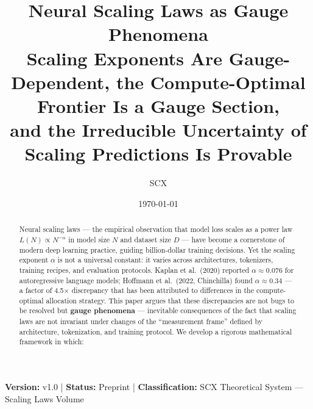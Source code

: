 \documentclass[12pt,a4paper]{article}
\title{\textbf{Neural Scaling Laws as Gauge Phenomena}\\[6pt]
\large Scaling Exponents Are Gauge-Dependent, the Compute-Optimal Frontier Is a Gauge Section,\\and the Irreducible Uncertainty of Scaling Predictions Is Provable}
\author{SCX}
\date{\today}
\theoremstyle{remark}
\begin{document}
\maketitle

\begin{center}
\footnotesize
\textbf{Version:} v1.0 \quad | \quad
\textbf{Status:} Preprint \quad | \quad
\textbf{Classification:} SCX Theoretical System — Scaling Laws Volume
\end{center}

\begin{abstract}
\noindent
Neural scaling laws — the empirical observation that model loss scales as a power law $L(N) \propto N^{-\alpha}$ in model size $N$ and dataset size $D$ — have become a cornerstone of modern deep learning practice, guiding billion-dollar training decisions. Yet the scaling exponent $\alpha$ is not a universal constant: it varies across architectures, tokenizers, training recipes, and evaluation protocols. Kaplan et al.\ (2020) reported $\alpha \approx 0.076$ for autoregressive language models; Hoffmann et al.\ (2022, Chinchilla) found $\alpha \approx 0.34$ — a factor of 4.5$\times$ discrepancy that has been attributed to differences in the compute-optimal allocation strategy. This paper argues that these discrepancies are not bugs to be resolved but \textbf{gauge phenomena} — inevitable consequences of the fact that scaling laws are not invariant under changes of the ``measurement frame'' defined by architecture, tokenization, and training protocol. We develop a rigorous mathematical framework in which:


\end{abstract}
\end{document}
